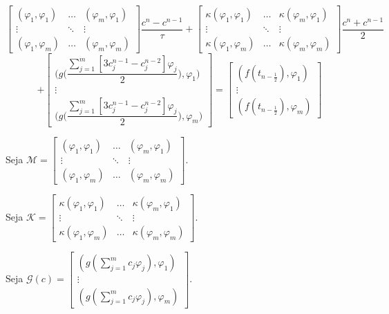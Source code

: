   \[
    \begin{bmatrix}
      (\varphi_1, \varphi_1) & \dots & (\varphi_m, \varphi_1) \\
      \vdots & \ddots & \vdots \\
      (\varphi_1, \varphi_m) & \dots & (\varphi_m, \varphi_m)
    \end{bmatrix} \dfrac{c^n - c^{n-1}}{\tau} +
    \begin{bmatrix}
      \kappa(\varphi_1, \varphi_1) & \dots & \kappa(\varphi_m, \varphi_1) \\
      \vdots & \ddots & \vdots \\
      \kappa(\varphi_1, \varphi_m) & \dots & \kappa(\varphi_m, \varphi_m)
    \end{bmatrix} \dfrac{c^n + c^{n-1}}{2}
    \]
    \[
    +\begin{bmatrix}
      \Biggl(g\Biggl(\dfrac{\sum_{j=1}^{m}[3c_j^{n-1} - c_j^{n-2}]\varphi_j}{2}\Biggr), \varphi_1 \Biggr)\\
      \vdots \\
      \Biggl(g\Biggl(\dfrac{\sum_{j=1}^{m}[3c_j^{n-1} - c_j^{n-2}]\varphi_j}{2}\Biggr), \varphi_m \Biggr)
    \end{bmatrix}
    =
    \begin{bmatrix}
      (f(t_{n - \frac{1}{2}}), \varphi_1) \\ \vdots \\ (f(t_{n - \frac{1}{2}}), \varphi_m)
    \end{bmatrix}
  \]

  Seja $\displaystyle \mathcal{M} = \begin{bmatrix} (\varphi_1, \varphi_1) & \dots & (\varphi_m, \varphi_1) \\ \vdots & \ddots & \vdots \\ (\varphi_1, \varphi_m) & \dots & (\varphi_m, \varphi_m) \end{bmatrix}$.

  Seja $\displaystyle \mathcal{K} = \begin{bmatrix} \kappa(\varphi_1, \varphi_1) & \dots & \kappa(\varphi_m, \varphi_1) \\ \vdots & \ddots & \vdots \\ \kappa(\varphi_1, \varphi_m) & \dots & \kappa(\varphi_m, \varphi_m) \end{bmatrix}$.

  Seja $\displaystyle \mathcal{G}(c) = \begin{bmatrix} (g(\sum_{j=1}^{m} c_j \varphi_j), \varphi_1) \\ \vdots \\ (g(\sum_{j=1}^{m} c_j \varphi_j), \varphi_m) \end{bmatrix}$.

